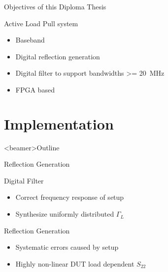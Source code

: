 \documentclass{beamer}
\begin{document}
\begin{frame}{Objectives of this Diploma Thesis}
    \begin{block}{Active Load Pull system}
        \begin{itemize}
            \item Baseband
            \item Digital reflection generation
            \item Digital filter to support bandwidths \SI{>= 20}{\mega\hertz}
            \item FPGA based
        \end{itemize}
    \end{block}
\end{frame}


\section{Implementation}

\begin{frame}<beamer>{Outline}
    \tableofcontents[currentsection]
\end{frame}

\begin{frame}{Reflection Generation}
    \begin{block}{Digital Filter}
        \begin{itemize}
            \item Correct frequency response of setup
            \item Synthesize uniformly distributed $\Gamma_L$
        \end{itemize}
    \end{block}
    \begin{block}{Reflection Generation}
        \begin{itemize}
            \item Systematic errors caused by setup
            \item Highly non-linear DUT load dependent $S_{22}$
        \end{itemize}
    \end{block}
\end{frame}

\end{document}
